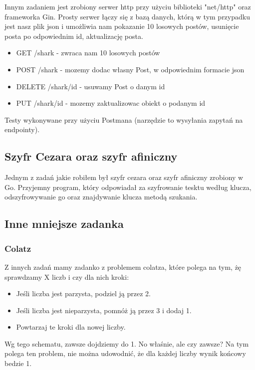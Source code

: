 \documentclass{article}
\begin{document}
Innym zadaniem jest zrobiony serwer http przy użyciu biblioteki "net/http" oraz frameworka Gin. Prosty serwer łączy się z bazą danych, którą w tym przypadku jest nasz plik json i umożliwia nam pokazanie 10 losowych postów, usunięcie posta po odpowiednim id, aktualizację posta.

\begin{itemize}
    \item GET /shark - zwraca nam 10 losowych postów
    \item POST /shark - mozemy dodac własny Post, w odpowiednim formacie json
    \item DELETE /shark/id - usuwamy Post o danym id
    \item PUT /shark/id - mozemy zaktualizowac obiekt o podanym id
\end{itemize}

Testy wykonywane przy użyciu Postmana (narzędzie to wysyłania zapytań na endpointy).

\subsection{Szyfr Cezara oraz szyfr afiniczny}

Jednym z zadań jakie robiłem był szyfr cezara oraz szyfr afiniczny zrobiony w Go. Przyjemny program, który odpowiadał za szyfrowanie tesktu według klucza, odszyfrowywanie go oraz znajdywanie klucza metodą szukania.


\subsection{Inne mniejsze zadanka}

\subsubsection{Colatz}

Z innych zadań mamy zadanko z problemem colatza, które polega na tym, żę sprawdzamy X liczb i czy dla nich kroki:
\begin{itemize}
    \item Jeśli liczba jest parzysta, podziel ją przez 2.
    \item Jeśli liczba jest nieparzysta, pomnóż ją przez 3 i dodaj 1.
    \item Powtarzaj te kroki dla nowej liczby.
\end{itemize}

Wg tego schematu, zawsze dojdziemy do 1. No właśnie, ale czy zawsze? Na tym polega ten problem, nie można udowodnić, że dla każdej liczby wynik końcowy bedzie 1.
\end{document}
